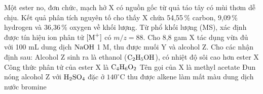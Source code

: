 \documentclass[11pt,a4paper]{article}
\begin{document}
\begin{ex}
Một ester no, đơn chức, mạch hở X có nguồn gốc từ quả táo tây có mùi thơm dễ chịu. Kết quả phân tích nguyên tố cho thấy X chứa 54,55\,\% carbon, 9,09\,\% hydrogen và 36,36\,\% oxygen về khối lượng. Từ phổ khối lượng (MS), xác định được tín hiệu ion phân tử $[\ce{M^+}]$ có $m/z = 88$. Cho 8,8 gam X tác dụng vừa đủ với 100 mL dung dịch $\ce{NaOH}$ 1 M, thu được muối Y và alcohol Z. Cho các nhận định sau:
\choiceTF
{\True Alcohol Z sinh ra là ethanol ($\ce{C2H5OH}$), có nhiệt độ sôi cao hơn ester X}
{Công thức phân tử của ester X là $\ce{C4H6O2}$}
{Tên gọi của X là methyl acetate}
{Đun nóng alcohol Z với $\ce{H2SO4}$ đặc ở $140^\circ\text{C}$ thu được alkene làm mất màu dung dịch nước bromine}



\end{ex}
\end{document}
